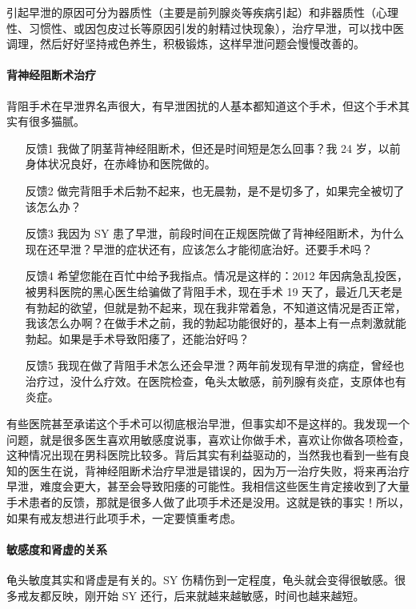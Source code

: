 \documentclass{ctexart}
\begin{document}
引起早泄的原因可分为器质性（主要是前列腺炎等疾病引起）和非器质性（心理性、习惯性、或因包皮过长等原因引发的射精过快现象），治疗早泄，可以找中医调理，然后好好坚持戒色养生，积极锻炼，这样早泄问题会慢慢改善的。

\paragraph{背神经阻断术治疗}

背阻手术在早泄界名声很大，有早泄困扰的人基本都知道这个手术，但这个手术其实有很多猫腻。

\begin{enumerate}
    \item[反馈1] 我做了阴茎背神经阻断术，但还是时间短是怎么回事？我 24 岁，以前身体状况良好，在赤峰协和医院做的。
    \item[反馈2] 做完背阻手术后勃不起来，也无晨勃，是不是切多了，如果完全被切了该怎么办？
    \item[反馈3] 我因为 SY 患了早泄，前段时间在正规医院做了背神经阻断术，为什么现在还早泄？早泄的症状还有，应该怎么才能彻底治好。还要手术吗？
    \item[反馈4] 希望您能在百忙中给予我指点。情况是这样的：2012 年因病急乱投医，被男科医院的黑心医生给骗做了背阻手术，现在手术 19 天了，最近几天老是有勃起的欲望，但就是勃不起来，现在我非常着急，不知道这情况是否正常，我该怎么办啊？在做手术之前，我的勃起功能很好的，基本上有一点刺激就能勃起。如果是手术导致阳痿了，还能治好吗？
    \item[反馈5] 我现在做了背阻手术怎么还会早泄？两年前发现有早泄的病症，曾经也治疗过，没什么疗效。在医院检查，龟头太敏感，前列腺有炎症，支原体也有炎症。
\end{enumerate}

有些医院甚至承诺这个手术可以彻底根治早泄，但事实却不是这样的。我发现一个问题，就是很多医生喜欢用敏感度说事，喜欢让你做手术，喜欢让你做各项检查，这种情况出现在男科医院比较多。背后其实有利益驱动的，当然我也看到一些有良知的医生在说，背神经阻断术治疗早泄是错误的，因为万一治疗失败，将来再治疗早泄，难度会更大，甚至会导致阳痿的可能性。我相信这些医生肯定接收到了大量手术患者的反馈，那就是很多人做了此项手术还是没用。这就是铁的事实！所以，如果有戒友想进行此项手术，一定要慎重考虑。

\paragraph{敏感度和肾虚的关系}

龟头敏度其实和肾虚是有关的。SY 伤精伤到一定程度，龟头就会变得很敏感。很多戒友都反映，刚开始 SY 还行，后来就越来越敏感，时间也越来越短。
\end{document}
